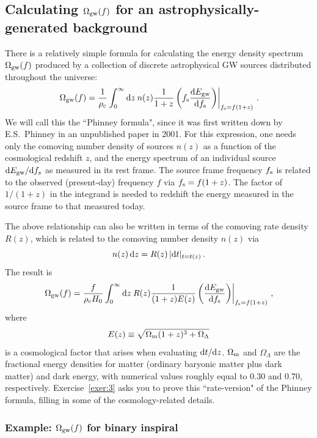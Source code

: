 \documentclass[11pt]{article}
\numberwithin{equation}{section}
\def\be{\begin{equation}}
\def\ee{\end{equation}}
\def\D{{\rm d}}
\begin{document}
\subsection{Calculating $\Omega_{\rm gw}(f)$ for an
astrophysically-generated background}
\label{s:Phinney_formula}

There is a relatively simple formula for calculating
the energy density spectrum $\Omega_{\rm gw}(f)$ 
produced by a collection of discrete astrophysical GW 
sources distributed throughout the universe\cite{Phinney:2001}:
%
\be
\left.
\Omega_{\rm gw}(f) = \frac{1}{\rho_{\rm c}}\int_0^\infty \D z\>
n(z) \frac{1}{1+z}\left(f_{\rm s}\frac{\D E_{\rm gw}}{\D f_{\rm s}}
\right)\right|_{f_{\rm s}=f(1+z)}\,.
\label{e:phinney1}
\ee
%
We will call this the ``Phinney formula", since it was 
first written down by E.S.~Phinney in an unpublished
paper in 2001.
For this expression,
one needs only the comoving number density of
sources $n(z)$ as a function of the cosmological redshift $z$, 
and the energy spectrum of an individual source
$\D E_{\rm gw}/\D f_s$ as measured in its rest frame.
The source frame frequency $f_{\rm s}$ is related to the 
observed (present-day) frequency $f$ via $f_{\rm s}=f(1+z)$.
The factor of $1/(1+z)$ in the integrand is needed to 
redshift the energy measured in the source frame to that
measured today.

The above relationship can also be written in terms of 
the comoving rate density $R(z)$, which is related to the
comoving number density $n(z)$ via
%
\be
n(z)\,\D z = R(z)\,|\D t|_{t=t(z)}\,.
\ee
%
The result is
%
\be
\left.
\Omega_{\rm gw}(f) = \frac{f}{\rho_{\rm c}H_0}\int_0^\infty \D z\>
R(z) \frac{1}{(1+z)E(z)}\left(\frac{\D E_{\rm gw}}{\D f_{\rm s}}
\right)\right|_{f_{\rm s}=f(1+z)}\,,
\label{e:phinney2}
\ee
%
where 
%
\be
E(z)\equiv \sqrt{\Omega_{\rm m}(1+z)^3 + \Omega_\Lambda}
\ee
%
is a cosmological factor that arises when evaluating $\D t/\D z$.
$\Omega_{\rm m}$ and $\Omega_\Lambda$ are the 
fractional energy densities for matter
(ordinary baryonic matter plus dark matter) 
and dark energy, with numerical values roughly
equal to $0.30$ and $0.70$, respectively.
Exercise~\ref{exer:3} asks you to prove this 
``rate-version" of the Phinney formula, filling in some 
of the cosmology-related details.

\subsubsection{Example: $\Omega_{\rm gw}(f)$ for binary inspiral}
\label{s:binary_inspiral}
\end{document}
